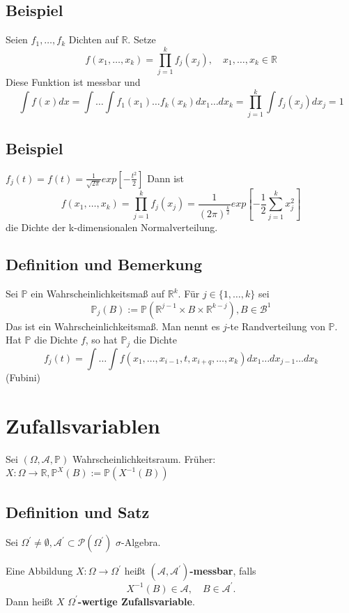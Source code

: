 \documentclass[a4paper,11pt,notitlepage]{report}
\newcommand{\R}{{\ensuremath{\mathbb{R}}}}
\newcommand{\Prim}{{\ensuremath{\mathbb{P}}}}
\begin{document}
\section{Beispiel} %
Seien $f_1, \ldots, f_k$ Dichten auf $\R$. Setze
$$f(x_1, \ldots, x_k) = \prod\limits_{j=1}^k{f_j(x_j)}, \quad x_1, \ldots, x_k \in \R$$
Diese Funktion ist messbar und
$$\int{f(x) dx} = \int \ldots \int f_1(x_1) \ldots f_k(x_k) dx_1 \ldots d x_k = \prod\limits_{j=1}^k{\int f_j(x_j) dx_j} = 1$$

\section{Beispiel} %
$f_j(t) = f(t) = \frac{1}{\sqrt{2 \pi}} exp[-\frac{t^2}{2}]$
\newline
Dann ist
$$f(x_1, \ldots, x_k) = \prod\limits_{j=1}^k{f_j(x_j)} = \frac{1}{(2 \pi)^{\frac{k}{2}}} exp[-\frac{1}{2} \sum\limits_{j=1}^k{x_j^2}]$$ die Dichte der k-dimensionalen Normalverteilung.

\section{Definition und Bemerkung}
Sei $\Prim$ ein Wahrscheinlichkeitsmaß auf $\R^k$. Für $j \in \{1, \ldots, k\}$ sei
$$\Prim_j(B) := \Prim(\R^{j-1} \times B \times \R^{k-j}), B \in \mathcal{B}^1$$
Das ist ein Wahrscheinlichkeitsmaß. Man nennt es $j$-te Randverteilung von $\Prim$. Hat $\Prim$ die Dichte $f$, so hat $\Prim_j$ die Dichte 
$$f_j(t) = \int \ldots \int f(x_1, \ldots, x_{i-1}, t, x_{i+q}, \ldots, x_k) d x_1 \ldots d x_{j-1} \ldots d x_k$$ (Fubini)

\chapter{Zufallsvariablen}
Sei $(\Omega, \mathcal{A}, \Prim)$ Wahrscheinlichkeitsraum.
\newline
Früher: $X \colon \Omega \rightarrow \R, \Prim^X(B) := \Prim(X^{-1}(B))$

\section{Definition und Satz}
Sei $\Omega^\prime \neq \emptyset, \mathcal{A}^\prime \subset \mathcal{P}(\Omega^\prime)$ $\sigma$-Algebra.

Eine Abbildung $X \colon \Omega \rightarrow \Omega^\prime$ heißt \textbf{$(\mathcal{A}, \mathcal{A}^\prime)$-messbar}, falls
$$X^{-1}(B) \in \mathcal{A}, \quad B \in \mathcal{A}^\prime.$$
Dann heißt $X$ \textbf{$\Omega^\prime$-wertige Zufallsvariable}.
\end{document}
